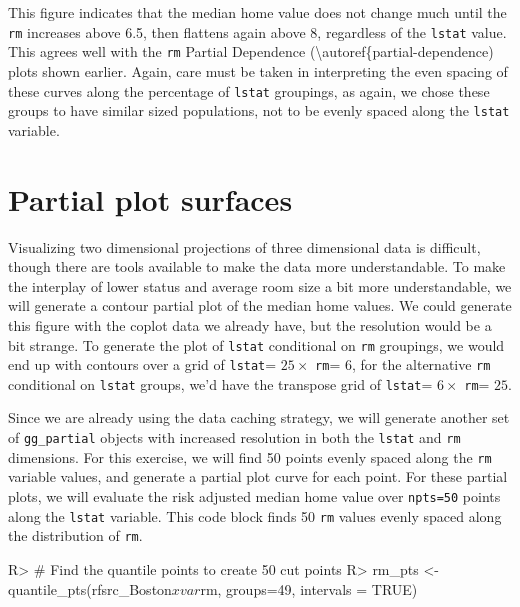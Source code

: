 \documentclass[article]{jss}
\begin{document}
This figure indicates that the median home value does not change much
until the \texttt{rm} increases above 6.5, then flattens again above 8,
regardless of the \texttt{lstat} value. This agrees well with the
\texttt{rm} Partial Dependence
(\textbackslash{}autoref\{partial-dependence) plots shown earlier.
Again, care must be taken in interpreting the even spacing of these
curves along the percentage of \texttt{lstat} groupings, as again, we
chose these groups to have similar sized populations, not to be evenly
spaced along the \texttt{lstat} variable.

\section{Partial plot surfaces}\label{partial-plot-surfaces}

Visualizing two dimensional projections of three dimensional data is
difficult, though there are tools available to make the data more
understandable. To make the interplay of lower status and average room
size a bit more understandable, we will generate a contour partial plot
of the median home values. We could generate this figure with the coplot
data we already have, but the resolution would be a bit strange. To
generate the plot of \texttt{lstat} conditional on \texttt{rm}
groupings, we would end up with contours over a grid of \texttt{lstat}=
\(25 \times\) \texttt{rm}= \(6\), for the alternative \texttt{rm}
conditional on \texttt{lstat} groups, we'd have the transpose grid of
\texttt{lstat}= \(6 \times\) \texttt{rm}= \(25\).

Since we are already using the data caching strategy, we will generate
another set of \texttt{gg\_partial} objects with increased resolution in
both the \texttt{lstat} and \texttt{rm} dimensions. For this exercise,
we will find 50 points evenly spaced along the \texttt{rm} variable
values, and generate a partial plot curve for each point. For these
partial plots, we will evaluate the risk adjusted median home value over
\texttt{npts=50} points along the \texttt{lstat} variable. This code
block finds 50 \texttt{rm} values evenly spaced along the distribution
of \texttt{rm}.

\begin{CodeChunk}

\begin{CodeInput}
R> # Find the quantile points to create 50 cut points
R> rm_pts <- quantile_pts(rfsrc_Boston$xvar$rm, groups=49, intervals = TRUE)
\end{CodeInput}
\end{CodeChunk}
\end{document}
